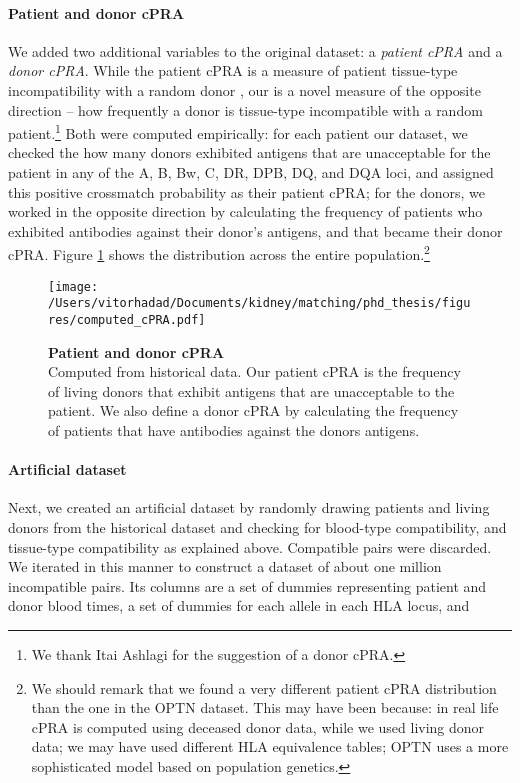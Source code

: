 \documentclass[format=acmsmall, review=false]{acmart}
\begin{document}
\paragraph{Patient and donor cPRA} We added two additional variables to the original dataset: a \emph{patient cPRA} and a \emph{donor cPRA}. While the patient cPRA is a measure of patient tissue-type incompatibility with a random donor \cite{cecka2010calculated}, our  is a novel measure of the opposite direction -- how frequently a donor is tissue-type incompatible with a random patient.\footnote{We thank Itai Ashlagi for the suggestion of a donor cPRA.} Both were computed empirically: for each patient our dataset, we checked the how many donors exhibited antigens that are unacceptable for the patient in any of the A, B, Bw, C, DR, DPB, DQ, and DQA loci, and assigned this positive crossmatch probability as their patient cPRA; for the donors, we worked in the opposite direction by calculating the frequency of patients who exhibited antibodies against their donor's antigens, and that became their donor cPRA. Figure \ref{fig:cpra} shows the distribution across the entire population.\footnote{We should remark that we found a very different patient cPRA distribution than the one in the OPTN dataset. This may have been because: in real life cPRA is computed using deceased donor data, while we used living donor data; we may have used different HLA equivalence tables; OPTN uses a more sophisticated model based on population genetics.\cite{optn2013cpra}}


\begin{figure}
\centering
\texttt{[image: /Users/vitorhadad/Documents/kidney/matching/phd\_thesis/figures/computed\_cPRA.pdf]}
\caption{\textbf{Patient and donor cPRA} \\
    Computed from historical data. Our patient cPRA is the frequency of living donors that exhibit antigens that are unacceptable to the patient. We also define a donor cPRA by calculating the frequency of patients that have antibodies against the donors antigens.}
\label{fig:cpra}
\end{figure}


\paragraph{Artificial dataset} Next, we created an artificial dataset by randomly drawing patients and living donors from the historical dataset and checking for blood-type compatibility, and tissue-type compatibility as explained above. Compatible pairs were discarded. We iterated in this manner to construct a dataset of about one million incompatible pairs. Its columns are a set of dummies representing patient and donor blood times, a set of dummies for each allele in each HLA locus, and 
\end{document}
